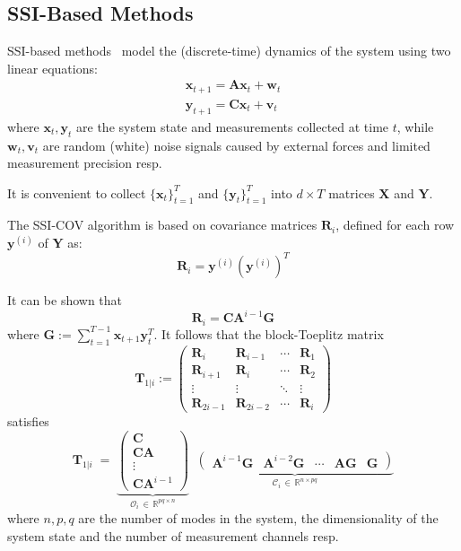 \documentclass[journal,a4paper]{IEEEtran}
\begin{document}
\subsection{SSI-Based Methods}\label{sec:ssi}

SSI-based methods~\cite{ssi} model the (discrete-time) dynamics of the system using two linear equations:
\begin{align*}
    \mathbf{x}_{t+1} = \mathbf{A}\mathbf{x}_{t} + \mathbf{w}_t \\
    \mathbf{y}_{t+1} = \mathbf{C}\mathbf{x}_{t} + \mathbf{v}_t
\end{align*}
where $\mathbf{x}_t, \mathbf{y}_t$ are the system state and measurements collected at time $t$, while $\mathbf{w}_t, \mathbf{v}_t$ are random (white) noise signals caused by external forces and limited measurement precision resp.

It is convenient to collect $\{\mathbf{x}_{t}\}_{t=1}^T$ and $\{\mathbf{y}_{t}\}_{t=1}^T$ into $d\times T$ matrices $\mathbf{X}$ and $\mathbf{Y}$.

The SSI-COV algorithm is based on covariance matrices $\mathbf{R}_i$, defined for each row $\mathbf{y}^{(i)}$ of $\mathbf{Y}$ as:
\[
\mathbf{R}_i = \mathbf{y}^{(i)}\left(\mathbf{y}^{(i)}\right)^T
\]

It can be shown that
\[
\mathbf{R}_i = \mathbf{C}\mathbf{A}^{i-1}\mathbf{G}
\]
where $\mathbf{G} := \sum_{t=1}^{T-1}\mathbf{x}_{t+1}\mathbf{y}_t^T$. It follows that the block-Toeplitz matrix
\[
\mathbf{T}_{1|i} := \begin{pmatrix}
\mathbf{R}_i     & \mathbf{R}_{i-1} & \cdots & \mathbf{R}_1 \\
\mathbf{R}_{i+1} & \mathbf{R}_i     & \cdots & \mathbf{R}_2 \\
\vdots           & \vdots           & \ddots & \vdots       \\
\mathbf{R}_{2i-1}& \mathbf{R}_{2i-2}& \cdots & \mathbf{R}_i
\end{pmatrix}
\]
satisfies
\[
\mathbf{T}_{1|i} \;=\; \underbrace{
    \begin{pmatrix}
        \mathbf{C}\\
        \mathbf{C}\mathbf{A}\\
        \vdots\\
        \mathbf{C}\mathbf{A}^{i-1}
        \end{pmatrix}
        }_{\boldsymbol{\mathcal{O}}_i \,\in\, \mathbb{R}^{pq\times n}}\;\;\underbrace{\begin{pmatrix}\mathbf{A}^{i-1}\mathbf{G} & \mathbf{A}^{i-2}\mathbf{G} & \cdots & \mathbf{A}\mathbf{G} & \mathbf{G}\end{pmatrix}}_{\boldsymbol{\mathcal{C}}_i \,\in\, \mathbb{R}^{n\times pq}}
\]
where $n, p, q$ are the number of modes in the system, the dimensionality of the system state and the number of measurement channels resp.
\end{document}
